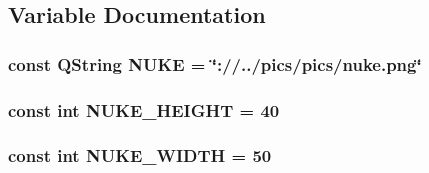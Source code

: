 \subsection{Variable Documentation}
\hypertarget{nukeactor_8hh_a533b7f84d79dc6971f2d2b7db8c9206e}{
\subsubsection[{N\-U\-K\-E}]{\setlength{\rightskip}{0pt plus 5cm}const Q\-String N\-U\-K\-E = \char`\"{}\-://../pics/pics/nuke.\-png\char`\"{}}}\label{nukeactor_8hh_a533b7f84d79dc6971f2d2b7db8c9206e}
\hypertarget{nukeactor_8hh_aa87a4f879db9b0096ae5c8b47973368c}{
\subsubsection[{N\-U\-K\-E\-\_\-\-H\-E\-I\-G\-H\-T}]{\setlength{\rightskip}{0pt plus 5cm}const int N\-U\-K\-E\-\_\-\-H\-E\-I\-G\-H\-T = 40}}\label{nukeactor_8hh_aa87a4f879db9b0096ae5c8b47973368c}
\hypertarget{nukeactor_8hh_a86069c9a9259fea726afb281654acb9c}{
\subsubsection[{N\-U\-K\-E\-\_\-\-W\-I\-D\-T\-H}]{\setlength{\rightskip}{0pt plus 5cm}const int N\-U\-K\-E\-\_\-\-W\-I\-D\-T\-H = 50}}\label{nukeactor_8hh_a86069c9a9259fea726afb281654acb9c}
